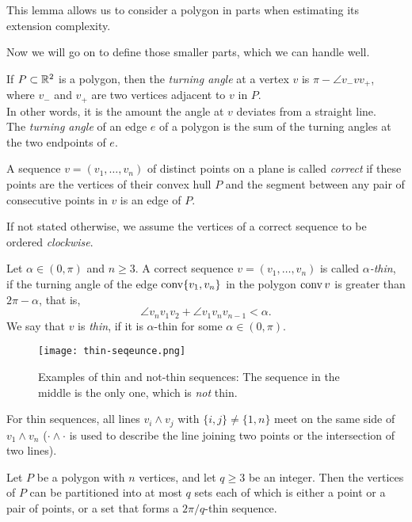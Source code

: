 This lemma allows us to consider a polygon in parts when estimating its extension complexity.

Now we will go on to define those smaller parts, which we can handle well.

\begin{definition}
  If $P\subset\mathbb{R}^2$ is a polygon, then the \emph{turning angle} at a vertex $v$ is $\pi-\angle v_-vv_+$, where $v_-$ and $v_+$ are two vertices adjacent to $v$ in $P$. \\
  In other words, it is the amount the angle at $v$ deviates from a straight line. \\
  The \emph{turning angle} of an edge $e$ of a polygon is the sum of the turning angles at the two endpoints of $e$.
\end{definition}

\begin{definition}
  A sequence $v=(v_1,\ldots,v_n)$ of distinct points on a plane is called \emph{correct} if these points are the vertices of their convex hull $P$ and the segment between any pair of consecutive points in $v$ is an edge of $P$.
\end{definition}

If not stated otherwise, we assume the vertices of a correct sequence to be ordered \emph{clockwise}.

\begin{definition}
  Let $\alpha\in(0,\pi)$ and $n \geq 3$. A correct sequence ${v=(v_1,\ldots,v_n)}$ is called \emph{$\alpha$-thin}, if the turning angle of the edge $\operatorname{conv}\{v_1, v_n\}$ in the polygon $\operatorname{conv} v$ is greater than $2\pi-\alpha$, that is, $$\angle v_n v_1 v_2+\angle v_1v_nv_{n-1}<\alpha.$$ We say that $v$ is \emph{thin}, if it is $\alpha$-thin for some $\alpha\in(0,\pi)$.
\end{definition}

\begin{figure}[ht]
  \centering
  \texttt{[image: thin-seqeunce.png]}
  \caption{Examples of thin and not-thin sequences: The sequence in the middle is the only one, which is \emph{not} thin.}
  \label{fig:thin-sequence}
\end{figure}

For thin sequences, all lines $v_i \wedge v_j$ with $\{i,j\} \neq \{1,n\}$ meet on the same side of $v_1 \wedge v_n$ ($\cdot\wedge\cdot$ is used to describe the line joining two points or the intersection of two lines).

\begin{observation}\label{observation:splitting}
  Let $P$ be a polygon with $n$ vertices, and let $q \geq 3$ be an integer. Then the vertices of $P$ can be partitioned into at most $q$ sets each of which is either a point or a pair of points, or a set that forms a $2\pi/q$-thin sequence.
\end{observation}

